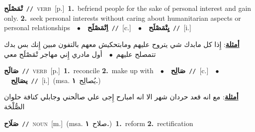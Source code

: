\documentclass[10pt,a4paper,twoside]{article} %
\begin{document}
\begin{multicols}{2}
{\setlength\topsep{0pt}\textbf{\foreignlanguage{arabic}{تْمَصْلَح}}\ {\color{gray}\texttt{//}\color{black}}\ \textsc{verb}\ [p.]\ \textbf{1.}~befriend people for the sake of personal interest and gain only.  \textbf{2.}~seek personal interests without caring about humanitarian aspects or personal relationships\ \ $\bullet$\ \ \setlength\topsep{0pt}\textbf{\foreignlanguage{arabic}{اِتْمَصْلَح}}\ {\color{gray}\texttt{//}\color{black}}\ [c.]\ \ $\bullet$\ \ \setlength\topsep{0pt}\textbf{\foreignlanguage{arabic}{يِتْمَصْلَح}}\ {\color{gray}\texttt{//}\color{black}}\ [i.]\  \begin{flushright}\color{gray}\foreignlanguage{arabic}{\textbf{\underline{\foreignlanguage{arabic}{أمثلة}}}: إِذا كل مابدك شي يتروح عليهم ومابتحكيش معهم بالتفون مبين إِنك بس بدك تتمصلح عليهم\ $\bullet$\ \  أول مادري إِني مهاجر تْمَصْلَح معي}\end{flushright}\color{black}} \vspace{2mm}

{\setlength\topsep{0pt}\textbf{\foreignlanguage{arabic}{صَالَح}}\ {\color{gray}\texttt{//}\color{black}}\ \textsc{verb}\ [p.]\ \textbf{1.}~reconcile  \textbf{2.}~make up with\ \ $\bullet$\ \ \setlength\topsep{0pt}\textbf{\foreignlanguage{arabic}{صَالِح}}\ {\color{gray}\texttt{//}\color{black}}\ [c.]\ \ $\bullet$\ \ \setlength\topsep{0pt}\textbf{\foreignlanguage{arabic}{يصَالِح}}\ {\color{gray}\texttt{//}\color{black}}\ [i.]\ \color{gray}(msa. \foreignlanguage{arabic}{يُصالِح}~\foreignlanguage{arabic}{\textbf{١.}})\color{black}\  \begin{flushright}\color{gray}\foreignlanguage{arabic}{\textbf{\underline{\foreignlanguage{arabic}{أمثلة}}}: مع انه قعد حردان شهر الا انه امبارح إِجى علي صالَحني وجابلي كنافة حلوان الصُّلْحَة}\end{flushright}\color{black}} \vspace{2mm}

{\setlength\topsep{0pt}\textbf{\foreignlanguage{arabic}{صَلَاح}}\ {\color{gray}\texttt{//}\color{black}}\ \textsc{noun}\ [m.]\ \color{gray}(msa. \foreignlanguage{arabic}{صلاح}~\foreignlanguage{arabic}{\textbf{١.}})\color{black}\ \textbf{1.}~reform  \textbf{2.}~rectification\ } \vspace{2mm}


\end{multicols}
\end{document}
